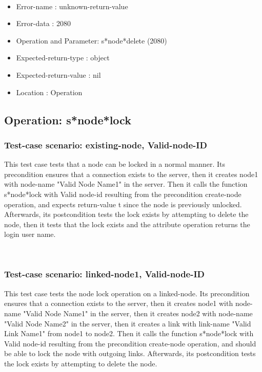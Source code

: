 \
\begin {itemize}
\item 	Error-name             : unknown-return-value
\item Error-data             : 2080
\item Operation and Parameter: s*node*delete (2080)
\item Expected-return-type   : object
\item Expected-return-value  : nil
\item Location               : Operation



\end {itemize}
\subsection {Operation: s*node*lock}
\subsubsection {Test-case scenario: existing-node, Valid-node-ID}


This test case tests that a node can be locked in a normal manner.
Its precondition ensures that a connection exists to the server, then it creates node1 with node-name "Valid Node Name1" in the server.
Then it calls the function s*node*lock  with Valid node-id resulting from the precondition create-node operation, and expects return-value t since the node is previously unlocked.
Afterwards, its postcondition tests the lock exists by attempting to delete the node, then it tests that the lock exists and the attribute operation returns the login user name.




\
\subsubsection {Test-case scenario: linked-node1, Valid-node-ID}


This test case tests the node lock operation on a linked-node.
Its precondition ensures that a connection exists to the server, then it creates node1 with node-name "Valid Node Name1" in the server, then it creates node2 with node-name  "Valid Node Name2" in the server, then it creates a link with link-name "Valid Link Name1" from node1 to node2.
Then it calls the function s*node*lock  with Valid node-id resulting from the precondition create-node operation, and should be able to lock the node with outgoing links.
Afterwards, its postcondition tests the lock exists by attempting to delete the node.




